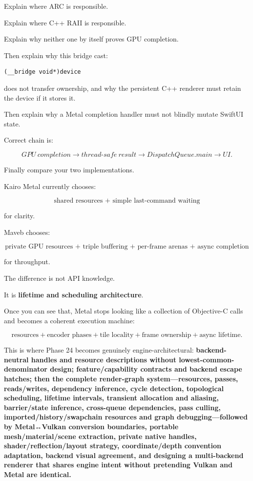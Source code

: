 Explain where ARC is responsible.

Explain where C++ RAII is responsible.

Explain why neither one by itself proves GPU completion.

Then explain why this bridge cast:

\begin{verbatim}
(__bridge void*)device
\end{verbatim}

does not transfer ownership, and why the persistent C++ renderer must retain the device if it stores it.

Then explain why a Metal completion handler must not blindly mutate SwiftUI state.

Correct chain is:

\[
GPU\ completion
\rightarrow
thread\text{-}safe\ result
\rightarrow
DispatchQueue.main
\rightarrow
UI.
\]

Finally compare your two implementations.

Kairo Metal currently chooses:

\[
\boxed{
\text{shared resources + simple last-command waiting}
}
\]

for clarity.

Maveb chooses:

\[
\boxed{
\text{private GPU resources + triple buffering + per-frame arenas + async completion}
}
\]

for throughput.

The difference is not API knowledge.

It is \textbf{lifetime and scheduling architecture}.

Once you can see that, Metal stops looking like a collection of Objective-C calls and becomes a coherent execution machine:

\[
\boxed{
\text{resources}
+
\text{encoder phases}
+
\text{tile locality}
+
\text{frame ownership}
+
\text{async lifetime}
}.
\]

This is where Phase 24 becomes genuinely engine-architectural: \textbf{backend-neutral handles and resource descriptions without lowest-common-denominator design; feature/capability contracts and backend escape hatches; then the complete render-graph system---resources, passes, reads/writes, dependency inference, cycle detection, topological scheduling, lifetime intervals, transient allocation and aliasing, barrier/state inference, cross-queue dependencies, pass culling, imported/history/swapchain resources and graph debugging---followed by Metal↔Vulkan conversion boundaries, portable mesh/material/scene extraction, private native handles, shader/reflection/layout strategy, coordinate/depth convention adaptation, backend visual agreement, and designing a multi-backend renderer that shares engine intent without pretending Vulkan and Metal are identical.}

